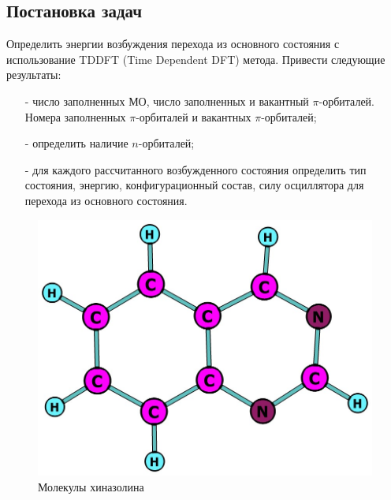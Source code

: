 \subsection{Постановка задач}
Определить энергии возбуждения перехода из основного состояния с использование TDDFT (Time Dependent DFT) метода. Привести следующие результаты:
\begin{itemize}
    \item[-] число заполненных МО, число заполненных и вакантный $\pi$-орбиталей. Номера заполненных $\pi$-орбиталей и вакантных $\pi$-орбиталей;
    \item[-] определить наличие $n$-орбиталей;
    \item[-] для каждого рассчитанного возбужденного состояния определить тип состояния, энергию, конфигурационный состав, силу осциллятора для перехода из основного состояния.
\end{itemize}

\begin{figure}[H]
\centering
\captionsetup{justification=centering}
\includegraphics[scale=0.4]{fig/1.jpg}
\caption{Молекулы хиназолина}
\end{figure}
